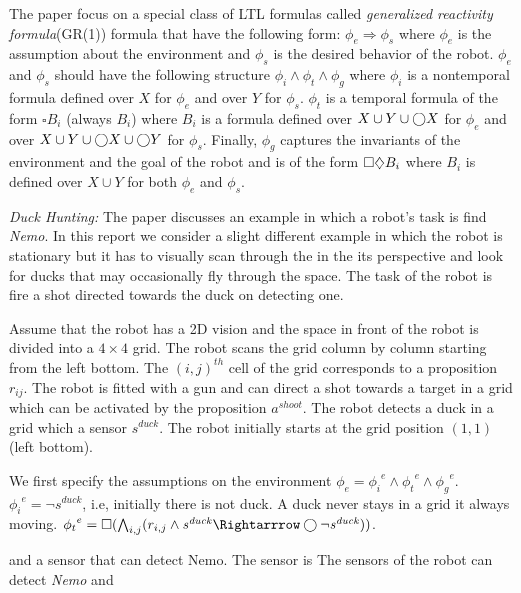 The paper focus on a special class of LTL formulas called \emph{generalized reactivity formula}(GR(1)) formula
that have the following form: $\phi_e \Rightarrow \phi_s$  where $\phi_e$ is the assumption
about the environment and $\phi_s$ is the desired behavior of the robot.
$\phi_e$ and $\phi_s$ should have the following structure $\phi_i \wedge \phi_t \wedge \phi_g$ where
$\phi_i$ is a nontemporal formula defined over $X$ for $\phi_e$ and over $Y$ for $\phi_s$. 
$\phi_t$ is a temporal formula of the form $\square B_i$ (always $B_i$) where $B_i$ is a formula 
defined over $X \cup Y \cup \bigcirc X$ for $\phi_e$ and over $X \cup Y \cup \bigcirc X \cup \bigcirc Y$ for
$\phi_s$. Finally, $\phi_g$ captures the invariants of the environment and the goal of the robot 
and is of the form $\square \diamondsuit B_i$
where $B_i$ is defined over $X \cup Y$ for both $\phi_e$ and $\phi_s$.

\newcommand{\shoot}{\mathit{a^{shoot}}}
\newcommand{\duck}{\mathit{s^{duck}}}

\textit{Duck Hunting:} The paper discusses an example in which a robot's task is find \emph{Nemo}.
In this report we consider a slight different example in which the robot is stationary but
it has to visually scan through the in the its perspective and look for ducks that may occasionally 
fly through the space. The task of the robot is fire a shot directed towards the duck on detecting one.

Assume that the robot has a 2D vision and the space in front of the robot is divided into a $4 \times 4$ grid.
The robot scans the grid column by column starting from the left bottom. 
The $(i,j)^{th}$ cell of the grid corresponds to a proposition $r_{ij}$.
The robot is fitted with a gun and can direct a shot towards a target in a grid which can be activated 
by the proposition $\shoot$. The robot detects a duck in a grid which a sensor $\duck$.
The robot initially starts at the grid position $(1,1)$ (left bottom).

We first specify the assumptions on the environment $\phi_e = {\phi_i}^e \wedge {\phi_t}^e \wedge {\phi_g}^e$.
${\phi_i}^e = \neg \duck$, i.e, initially there is not duck. 
A duck never stays in a grid it always moving.
${\phi_t}^e = \always(\bigwedge_{i,j} (r_{i,j} \wedge \duck \Rightarrrow \next \neg \duck))$.

 and a sensor that can detect Nemo.
The sensor is 
The sensors of the robot can detect \emph{Nemo}
and 
